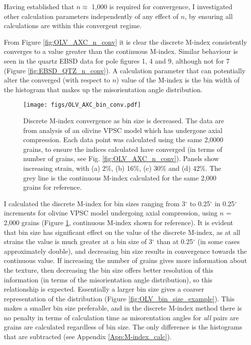 \documentclass[a4paper,12pt,twoside]{report}
\numberwithin{equation}{chapter}
\begin{document}
Having established that $n \approx$ 1,000 is required for convergence, I investigated other calculation parameters independently of any effect of $n$, by ensuring all calculations are within this convergent regime. 

From Figure \ref{fig:OLV_AXC_n_conv} it is clear the discrete M-index consistently converges to a value greater than the continuous M-index. Similar behaviour is seen in the quartz EBSD data for pole figures 1, 4 and 9, although not for 7 (Figure \ref{fig:EBSD_QTZ_n_conv}). A calculation parameter that can potentially alter the converged (with respect to $n$) value of the M-index is the bin width of the histogram that makes up the misorientation angle distribution.   

\begin{figure}[h!]
  \centering
    \texttt{[image: figs/OLV\_AXC\_bin\_conv.pdf]}
  \caption[Convergence with bin size (olivine VPSC)]{Discrete M-index convergence as bin size is decreased. The data are from analysis of an olivine VPSC model which has undergone axial compression. Each data point was calculated using the same 2,0000 grains, to ensure the indices calculated have converged (in terms of number of grains, see Fig. \ref{fig:OLV_AXC_n_conv}). Panels show increasing strain, with (a) 2\%, (b) 16\%, (c) 30\% and (d) 42\%. The grey line is the continuous M-index calculated for the same 2,000 grains for reference.}
  \label{fig:OLV_AXC_b_conv}
\end{figure}  

I calculated the discrete M-index for bin sizes ranging from 3$^\circ$ to 0.25$^\circ$ in 0.25$^\circ$ increments for olivine VPSC model undergoing axial compression, using $n$ = 2,000 grains (Figure \ref{fig:OLV_AXC_b_conv}, continuous M-index shown for reference). It is evident that bin size has significant effect on the value of the discrete M-index, as at all strains the value is much greater at a bin size of 3$^\circ$ than at 0.25$^\circ$ (in some cases approximately double), and decreasing bin size results in convergence towards the continuous value. If increasing the number of grains gives more information about the texture, then decreasing the bin size offers better resolution of this information (in terms of the misorientation angle distribution), so this relationship is expected. Essentially a larger bin size gives a coarser representation of the distribution (Figure \ref{fig:OLV_bin_size_example}). This makes a smaller bin size preferable, and in the discrete M-index method there is no penalty in terms of calculation time as misorentation angles for \emph{all} pairs are grains are calculated regardless of bin size. The only difference is the histograms that are subtracted (see Appendix \ref{App:M-index_calc}).
\end{document}
